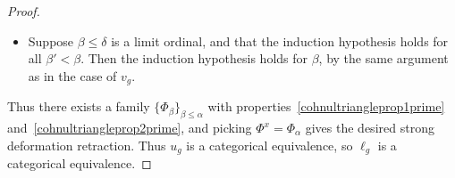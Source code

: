 \documentclass{tac}
\newcommand{\s}[1]{\mathscr{#1}}
\newcommand{\tx}[1]{\textnormal{#1}}
\begin{document}
\begin{proof}
\begin{itemize}
Thus we are left with an extension problem
\[ \begin{tikzcd}
\big( (\Delta^1 \times \Delta^n) \star \Delta^{\{1,2 \}} \big) \cup \big( (\Delta^{\{1\}} \times \Delta^n )\star \Lambda^2_2 \big) \cup \big( (\Delta^{1} \times \partial \Delta^n )\star \Lambda^2_2 \big) \arrow[]{r}{(r, \chi , \rho)} \arrow[equal]{d} & \s{C} \\
\big( (\Delta^1 \times \Delta^n) \star \Delta^{\{1,2 \}} \big) \cup \big( ( \Delta^{\{1\}} \times  \Delta^n  \cup \Delta^{1} \times \partial \Delta^n )\star \Lambda^2_2 \big) \arrow[hook]{d} & \\
(\Delta^1 \times \Delta^n) \star \Lambda^2_2 \arrow[dashed, bend right =30]{uur}[swap]{\tilde{\chi}}, &
\end{tikzcd}\]
which is solvable because the left vertical is inner anodyne by (\cite{htt}, 2.1.2.6 and 2.1.2.3).  The map $\tilde{\chi}$ then corresponds to an $n$-simplex $\phi_{\varpi} : \Delta^n \to \tx{Fun}(\Delta^1 , (\s{C}'_{/ \tilde{g}})_x)$ with the desired properties.
\item Suppose $\beta \leq \delta$ is a limit ordinal, and that the induction hypothesis holds for all $\beta' < \beta$.  Then the induction hypothesis holds for $\beta$, by the same argument as in the case of $v_g$.
\end{itemize}
Thus there exists a family $\{\Phi_\beta \}_{\beta \leq \alpha}$ with properties~\ref{cohnultriangleprop1prime} and~\ref{cohnultriangleprop2prime}, and picking $\Phi^x = \Phi_\alpha$ gives the desired strong deformation retraction.  Thus $u_g$ is a categorical equivalence, so $\ell_g$ is a categorical equivalence.
\end{proof}
\end{document}
